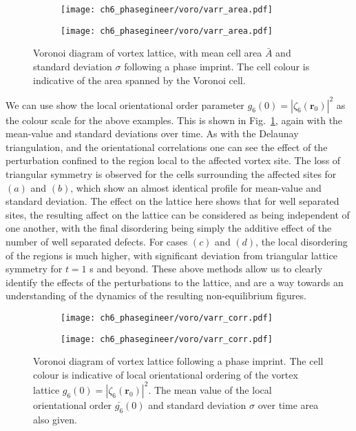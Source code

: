 \begin{figure}\ContinuedFloat\centering
    \begin{subfigure}{0.6\textwidth}
        \texttt{[image: ch6\_phasegineer/voro/varr\_area.pdf]}
    \end{subfigure}
    \begin{subfigure}{0.6\textwidth}
        \texttt{[image: ch6\_phasegineer/voro/varr\_area.pdf]}
    \end{subfigure}
    \caption{Voronoi diagram of vortex lattice, with mean cell area $\bar{A}$ and standard deviation $\sigma$ following a phase imprint. The cell colour is indicative of the area spanned by the Voronoi cell.}
\end{figure}

We can use show the local orientational order parameter $g_6(0) = |\zeta_6(\mathbf{r}_0)|^2$ as the colour scale for the above examples. This is shown in Fig.~\ref{fig:voronoiscorr}, again with the mean-value and standard deviations over time. As with the Delaunay triangulation, and the orientational correlations one can see the effect of the perturbation confined to the region local to the affected vortex site. The loss of triangular symmetry is observed for the cells surrounding the affected sites for $(a)$ and $(b)$, which show an almost identical profile for mean-value and standard deviation. The effect on the lattice here shows that for well separated sites, the resulting affect on the lattice can be considered as being independent of one another, with the final disordering being simply the additive effect of the number of well separated defects. For cases $(c)$ and $(d)$, the local disordering of the regions is much higher, with significant deviation from triangular lattice symmetry for $t=1$ s and beyond. These above methods allow us to clearly identify the effects of the perturbations to the lattice, and are a way towards an understanding of the dynamics of the resulting non-equilibrium figures.

\begin{figure}\centering
    \begin{subfigure}{0.6\textwidth}
        \texttt{[image: ch6\_phasegineer/voro/varr\_corr.pdf]}
    \end{subfigure}
    \begin{subfigure}{0.6\textwidth}
        \texttt{[image: ch6\_phasegineer/voro/varr\_corr.pdf]}
    \end{subfigure}
    \caption{Voronoi diagram of vortex lattice following a phase imprint. The cell colour is indicative of local orientational ordering of the vortex lattice $g_6(0) = |\zeta_6(\mathbf{r}_0)|^2$. The mean value of the local orientational order $\bar{g_6}(0)$ and standard deviation $\sigma$ over time area also given.}\label{fig:voronoiscorr}
\end{figure}

